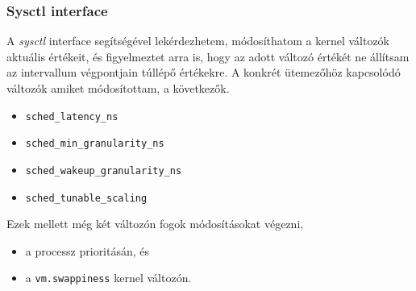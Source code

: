 \documentclass{beamer}
\begin{document}
\begin{frame}
\frametitle{Sysctl interface}
A \textit{sysctl} interface segítségével lekérdezhetem, módosíthatom a kernel változók aktuális értékeit, és figyelmeztet arra is, hogy az adott változó értékét ne állítsam az intervallum végpontjain túllépő értékekre.
A konkrét ütemezőhöz kapcsolódó változók amiket módosítottam, a következők.

\begin{itemize}
\item \texttt{sched\_latency\_ns}
\item \texttt{sched\_min\_granularity\_ns}
\item \texttt{sched\_wakeup\_granularity\_ns}
\item \texttt{sched\_tunable\_scaling}
\end{itemize}

\bigskip

Ezek mellett még két változón fogok módosításokat végezni,
\begin{itemize}
	\item a processz prioritásán, és
	\item a \texttt{vm.swappiness} kernel változón.
\end{itemize}
 
\end{frame}
\end{document}
